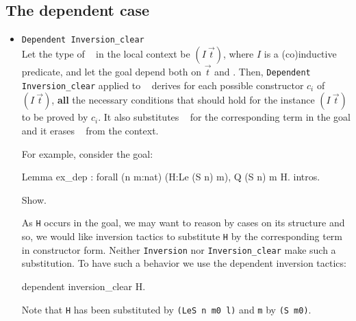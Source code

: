 \subsection{The dependent case}
\begin{itemize}
\item \texttt{Dependent Inversion\_clear} \ident~\\
  Let the type of \ident~ in the local context be $(I~\vec{t})$,
  where $I$ is a (co)inductive predicate, and let the goal  depend both on
  $\vec{t}$ and \ident. Then, 
  \texttt{Dependent Inversion\_clear} applied to \ident~ derives 
   for each possible constructor $c_i$ of $(I~\vec{t})$, {\bf all} the
  necessary conditions that should hold for the instance $(I~\vec{t})$ to be
  proved by $c_i$. It also substitutes  \ident~ for the corresponding
  term  in the goal and  it erases \ident~ from the context.


For example, consider the  goal:
\begin{coq_eval}
Lemma ex_dep : forall (n m:nat) (H:Le (S n) m), Q (S n) m H.
intros.
\end{coq_eval}

\begin{coq_example}
Show.
\end{coq_example}

As \texttt{H} occurs in the goal, we may want to reason by cases on its
structure and so, we would like  inversion tactics to
substitute \texttt{H} by the corresponding term in constructor form. 
Neither \texttt{Inversion} nor  {\tt Inversion\_clear} make such a
substitution. To have such a behavior we use the dependent inversion tactics:

\begin{coq_example}
dependent inversion_clear H.
\end{coq_example}

Note that \texttt{H} has been substituted by \texttt{(LeS n m0 l)} and
\texttt{m} by \texttt{(S m0)}.


\end{itemize}

